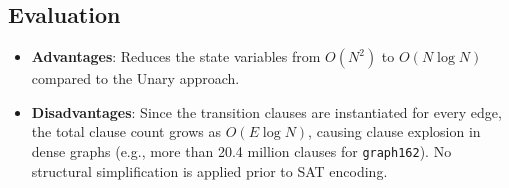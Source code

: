 \subsection{Evaluation}
\begin{itemize}
    \item \textbf{Advantages}: Reduces the state variables from $O(N^2)$ to $O(N \log N)$ compared to the Unary approach.
    \item \textbf{Disadvantages}: Since the transition clauses are instantiated for every edge, the total clause count grows as $O(E \log N)$, causing clause explosion in dense graphs (e.g., more than 20.4 million clauses for \texttt{graph162}). No structural simplification is applied prior to SAT encoding.
\end{itemize}
